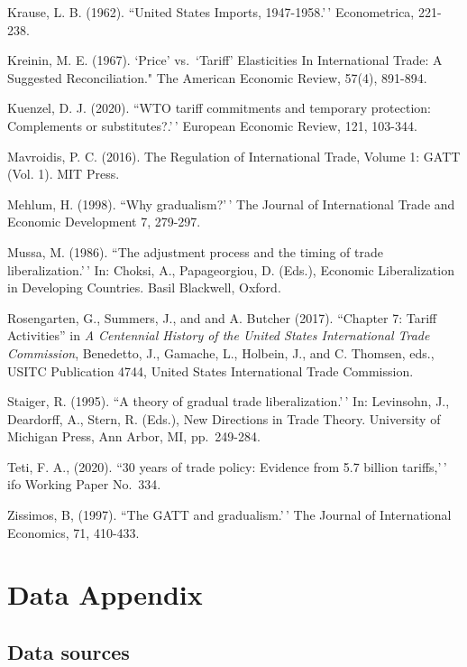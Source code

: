 \documentclass[
  12pt,
]{article}
\begin{document}
Krause, L. B. (1962). ``United States Imports, 1947-1958.'\,' Econometrica, 221-238.

Kreinin, M. E. (1967). `\texttt{}Price' vs.~`Tariff' Elasticities In International Trade: A Suggested Reconciliation." The American Economic Review, 57(4), 891-894.

Kuenzel, D. J. (2020). ``WTO tariff commitments and temporary protection: Complements or substitutes?.'\,' European Economic Review, 121, 103-344.

Mavroidis, P. C. (2016). The Regulation of International Trade, Volume 1: GATT (Vol. 1). MIT Press.

Mehlum, H. (1998). ``Why gradualism?'\,' The Journal of International Trade and Economic Development 7, 279-297.

Mussa, M. (1986). ``The adjustment process and the timing of trade liberalization.'\,' In: Choksi, A., Papageorgiou, D. (Eds.), Economic Liberalization in Developing Countries. Basil Blackwell, Oxford.

Rosengarten, G., Summers, J., and and A. Butcher (2017). ``Chapter 7: Tariff Activities'' in \emph{A Centennial History of the United States International Trade Commission}, Benedetto, J., Gamache, L., Holbein, J., and C. Thomsen, eds., USITC Publication 4744, United States International Trade Commission.

Staiger, R. (1995). ``A theory of gradual trade liberalization.'\,' In: Levinsohn, J., Deardorff, A., Stern, R. (Eds.), New Directions in Trade Theory. University of Michigan Press, Ann Arbor, MI, pp.~249-284.

Teti, F. A., (2020). ``30 years of trade policy: Evidence from 5.7 billion tariffs,'\,' ifo Working Paper No.~334.

Zissimos, B, (1997). ``The GATT and gradualism.'\,' The Journal of International Economics, 71, 410-433.

\hypertarget{dataappendix}{%
\section{Data Appendix}\label{dataappendix}}

\hypertarget{sources}{%
\subsection{Data sources}\label{sources}}
\end{document}
